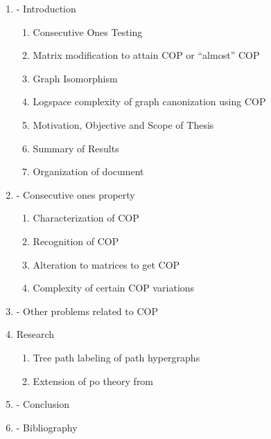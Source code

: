 \documentclass[MS,synopsis]{iitmdiss}
\begin{document}
\begin{enumerate}[{Chapter} 1]
\item - Introduction
  \begin{enumerate} [{Section 1.}1]
  \item Consecutive Ones Testing
  \item Matrix modification to attain COP or ``almost'' COP
  \item Graph Isomorphism
  \item Logspace complexity of graph canonization using COP
  \item Motivation, Objective and Scope of Thesis
  \item Summary of Results
  \item Organization of document
  \end{enumerate}

\item - Consecutive ones property %
  \begin{enumerate}[{Section 2.}1]
  \item Characterization of COP
  \item Recognition of COP
  \item Alteration to matrices to get COP
  \item Complexity of certain COP variations
  \end{enumerate}

\item - Other problems related to COP %

\item Research %
  \begin{enumerate}[{Section 4.}1]
  \item Tree path labeling of path
    hypergraphs%
  \item Extension of po theory from \cite{nsnrs09}
  \end{enumerate}

\item - Conclusion

\item - Bibliography

\end{enumerate}
\end{document}
